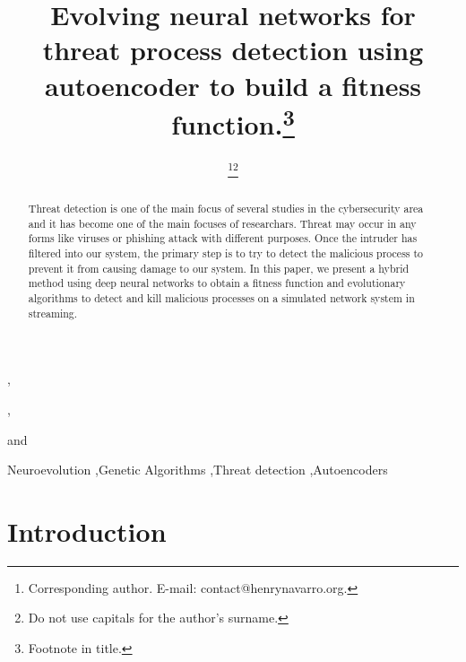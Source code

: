 \documentclass{iosart2c}
\begin{document}
\begin{frontmatter}                           %

%
\title{Evolving neural networks for threat process detection using autoencoder to build a fitness function.\thanks{Footnote in title.}}



\author[A]{ \thanks{Corresponding author. E-mail: contact@henrynavarro.org.}\thanks{Do not use capitals for the author's surname.}},
\author[B]{ },
\author[B]{ }
and
\author[B]{ }
\address[A]{Research and Development Lab, Vision Analytics, Avenida de Europa 19, 28224, Pozuelo de Alarcón, Madrid,\\ Spain\\
E-mail: contact@henrynavarro.org}
\address[B]{Research and Development Labs, Capgemini Engineering, Calle Campezo, 1, 28022, Madrid, Spain.\\
E-mail: engineering@capgemini.com}

\begin{abstract}
Threat detection is one of the main focus of several studies in the cybersecurity area and it has become one of the main focuses of researchars. Threat may occur in any forms like viruses or phishing attack with different purposes. Once the intruder has filtered into our system, the primary step is to try to detect the malicious process to prevent it from causing damage to our system. In this paper, we present a hybrid method using deep neural networks to obtain a fitness function and evolutionary algorithms to detect and kill malicious processes on a simulated network system in streaming.
\end{abstract}

\begin{keyword}
Neuroevolution \sep Genetic Algorithms \sep Threat detection \sep Autoencoders
\end{keyword}

\end{frontmatter}



\section{Introduction}
\end{document}
